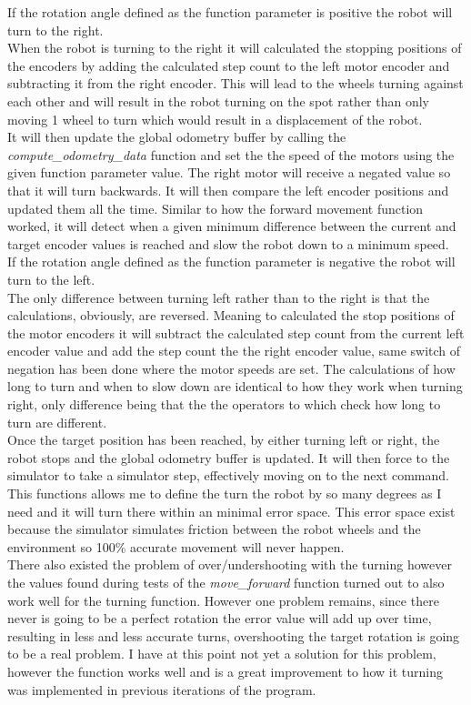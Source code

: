 \begin{flushleft}
If the rotation angle defined as the function parameter is positive the robot will turn to the right.\\
When the robot is turning to the right it will calculated the stopping positions of the encoders by adding the calculated step count to the left motor encoder and subtracting it from the right encoder. This will lead to the wheels turning against each other and will result in the robot turning on the spot rather than only moving 1 wheel to turn which would result in a displacement of the robot. \\
It will then update the global odometry buffer by calling the \textit{compute\_odometry\_data} function and set the the speed of the motors using the given function parameter value. The right motor will receive a negated value so that it will turn backwards. 
It will then compare the left encoder positions and updated them all the time. Similar to how the forward movement function worked, it will detect when a given minimum difference between the current and target encoder values is reached and slow the robot down to a minimum speed. \\[3ex]

If the rotation angle defined as the function parameter is negative the robot will turn to the left.\\
The only difference between turning left rather than to the right is that the calculations, obviously, are reversed. Meaning to calculated the stop positions of the motor encoders it will subtract the calculated step count from the current left encoder value and add the step count the the right
encoder value, same switch of negation has been done where the motor speeds are set.
The calculations of how long to turn and when to slow down are identical to how they work when turning right, only difference being that the the operators to which check how long to turn are different.\\
Once the target position has been reached, by either turning left or right, the robot stops and the global odometry buffer is updated. 
It will then force to the simulator to take a simulator step, effectively moving on to the next command.\\[3ex]

This functions allows me to define the turn the robot by so many degrees as I need and it will turn there within an minimal error space. This error space exist because the simulator simulates friction between the robot wheels and the environment so 100\% accurate movement will never happen.\\
There also existed the problem of over/undershooting with the turning however the values found during tests of the \textit{move\_forward} function turned out to also work well for the turning function. However one problem remains, since there never is going to be a perfect rotation the error value will add up over time, resulting in less and less accurate turns, overshooting the target rotation is going to be a real problem. I have at this point not yet a solution for this problem, however the function works well and is a great improvement to how it turning was implemented in previous iterations of the program.


\end{flushleft}
